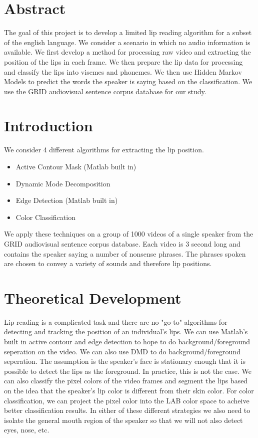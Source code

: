 \documentclass{article}
\begin{document}
\section*{Abstract}
The goal of this project is to develop a limited lip reading algorithm for a subset of the english language. We consider a scenario in which no audio information is available. We first develop a method for processing raw video and extracting the position of the lips in each frame. We then prepare the lip data for processing and classify the lips into visemes and phonemes. We then use Hidden Markov Models to predict the words the speaker is saying based on  the classification. We use the GRID audiovisual sentence corpus database for our study. 

\section{Introduction}
We consider 4 different algorithms for extracting the lip position. \begin{itemize}
  \item Active Contour Mask (Matlab built in)
\item Dynamic Mode Decomposition 
\item Edge Detection (Matlab built in)
\item Color Classification
\end{itemize}
We apply these techniques on a group of 1000 videos of a single speaker from the GRID audiovisual sentence corpus database. Each video is 3 second long and contains the speaker saying a number of nonsense phrases. The phrases spoken are chosen to convey a variety of sounds and therefore lip positions.



\section{Theoretical Development}
Lip reading is a complicated task and there are no "go-to" algorithms for detecting and tracking the position of an individual's lips. We can use Matlab's built in active contour and edge detection to hope to do background/foreground seperation on the video. We can also use DMD to do background/foreground seperation. The assumption is the speaker's face is stationary enough that it is possible to detect the lips as the foreground. In practice, this is not the case. We can also classify the pixel colors of the video frames and segment the lips based on the idea that the speaker's lip color is different from their skin color. For color classification, we can project the pixel color into the LAB color space to acheive better classification results. In either of these different strategies we also need to isolate the general mouth region of the speaker so that we will not also detect eyes, nose, etc.
\end{document}
